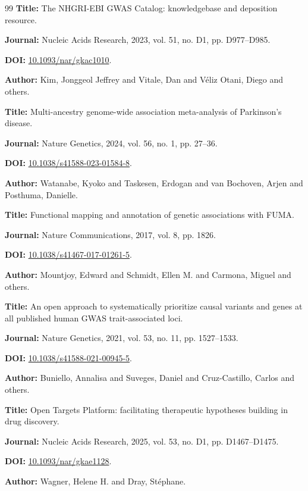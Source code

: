\documentclass[10pt,twocolumn]{article}
\begin{document}
\begin{thebibliography}{99}
\textbf{Title:} The NHGRI-EBI GWAS Catalog: knowledgebase and deposition resource.

\textbf{Journal:} Nucleic Acids Research, 2023, vol. 51, no. D1, pp. D977--D985.

\textbf{DOI:} \href{https://doi.org/10.1093/nar/gkac1010}{10.1093/nar/gkac1010}.

\textbf{Author:} Kim, Jonggeol Jeffrey and Vitale, Dan and V{\'e}liz Otani, Diego and others.

\textbf{Title:} Multi-ancestry genome-wide association meta-analysis of Parkinson's disease.

\textbf{Journal:} Nature Genetics, 2024, vol. 56, no. 1, pp. 27--36.

\textbf{DOI:} \href{https://doi.org/10.1038/s41588-023-01584-8}{10.1038/s41588-023-01584-8}.

\textbf{Author:} Watanabe, Kyoko and Taskesen, Erdogan and van Bochoven, Arjen and Posthuma, Danielle.

\textbf{Title:} Functional mapping and annotation of genetic associations with FUMA.

\textbf{Journal:} Nature Communications, 2017, vol. 8, pp. 1826.

\textbf{DOI:} \href{https://doi.org/10.1038/s41467-017-01261-5}{10.1038/s41467-017-01261-5}.

\textbf{Author:} Mountjoy, Edward and Schmidt, Ellen M. and Carmona, Miguel and others.

\textbf{Title:} An open approach to systematically prioritize causal variants and genes at all published human GWAS trait-associated loci.

\textbf{Journal:} Nature Genetics, 2021, vol. 53, no. 11, pp. 1527--1533.

\textbf{DOI:} \href{https://doi.org/10.1038/s41588-021-00945-5}{10.1038/s41588-021-00945-5}.

\textbf{Author:} Buniello, Annalisa and Suveges, Daniel and Cruz-Castillo, Carlos and others.

\textbf{Title:} Open Targets Platform: facilitating therapeutic hypotheses building in drug discovery.

\textbf{Journal:} Nucleic Acids Research, 2025, vol. 53, no. D1, pp. D1467--D1475.

\textbf{DOI:} \href{https://doi.org/10.1093/nar/gkae1128}{10.1093/nar/gkae1128}.

\textbf{Author:} Wagner, Helene H. and Dray, St{\'e}phane.


\end{thebibliography}
\end{document}
